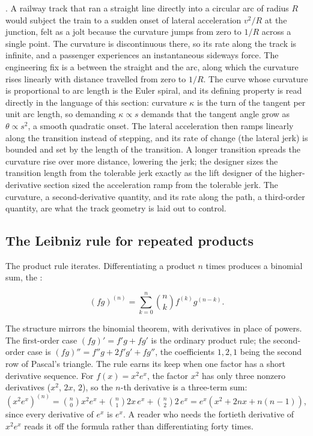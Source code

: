 . A
railway track that ran a straight line directly into a circular arc
of radius $R$ would subject the train to a sudden onset of lateral
acceleration $v^{2}/R$ at the junction, felt as a jolt because the
curvature jumps from zero to $1/R$ across a single point. The
curvature is discontinuous there, so its rate along the track is
infinite, and a passenger experiences an instantaneous sideways
force. The engineering fix is a  between
the straight and the arc, along which the curvature rises linearly
with distance travelled from zero to $1/R$. The curve whose
curvature is proportional to arc length is the Euler spiral, and
its defining property is read directly in the language of this
section: curvature $\kappa$ is the turn of the tangent per unit arc
length, so demanding $\kappa \propto s$ demands that the tangent
angle grow as $\theta \propto s^{2}$, a smooth quadratic onset. The
lateral acceleration then ramps linearly along the transition
instead of stepping, and its rate of change (the lateral jerk) is
bounded and set by the length of the transition. A longer transition
spreads the curvature rise over more distance, lowering the jerk; the
designer sizes the transition length from the tolerable jerk exactly
as the lift designer of the higher-derivative section sized the
acceleration ramp from the tolerable jerk. The curvature, a
second-derivative quantity, and its rate along the path, a third-order
quantity, are what the track geometry is laid out to control.

\subsection{The Leibniz rule for repeated products}

The product rule iterates. Differentiating a product $n$ times
produces a binomial sum, the :

\[
(f g)^{(n)} = \sum_{k=0}^{n} \binom{n}{k} f^{(k)} g^{(n - k)}.
\]

The structure mirrors the binomial theorem, with derivatives in
place of powers. The first-order case $(f g)' = f' g + f g'$ is the
ordinary product rule; the second-order case is $(f g)'' = f'' g +
2 f' g' + f g''$, the coefficients $1, 2, 1$ being the second row
of Pascal's triangle. The rule earns its keep when one factor has a
short derivative sequence. For $f(x) = x^{2} e^{x}$, the factor
$x^{2}$ has only three nonzero derivatives ($x^{2}$, $2x$, $2$),
so the $n$-th derivative is a three-term sum: $(x^{2} e^{x})^{(n)}
= \binom{n}{0} x^{2} e^{x} + \binom{n}{1} 2x \, e^{x} +
\binom{n}{2} 2 \, e^{x} = e^{x}(x^{2} + 2 n x + n(n-1))$, since
every derivative of $e^{x}$ is $e^{x}$. A reader who needs the
fortieth derivative of $x^{2} e^{x}$ reads it off the formula
rather than differentiating forty times.

